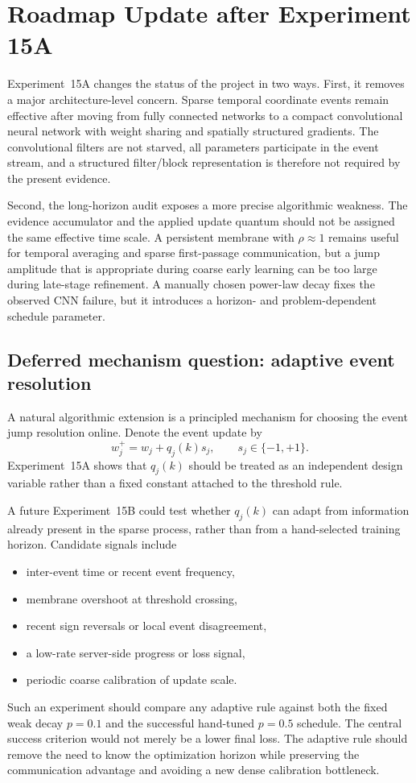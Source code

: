 \section{Roadmap Update after Experiment 15A}
\label{sec:roadmap-post-15a}

Experiment~15A changes the status of the project in two ways. First, it removes a major architecture-level concern. Sparse temporal coordinate events remain effective after moving from fully connected networks to a compact convolutional neural network with weight sharing and spatially structured gradients. The convolutional filters are not starved, all parameters participate in the event stream, and a structured filter/block representation is therefore not required by the present evidence.

Second, the long-horizon audit exposes a more precise algorithmic weakness. The evidence accumulator and the applied update quantum should not be assigned the same effective time scale. A persistent membrane with $\rho\approx1$ remains useful for temporal averaging and sparse first-passage communication, but a jump amplitude that is appropriate during coarse early learning can be too large during late-stage refinement. A manually chosen power-law decay fixes the observed CNN failure, but it introduces a horizon- and problem-dependent schedule parameter.

\subsection{Deferred mechanism question: adaptive event resolution}

A natural algorithmic extension is a principled mechanism for choosing the event jump resolution online. Denote the event update by
\begin{equation}
w_j^+=w_j+q_j(k)s_j,
\qquad s_j\in\{-1,+1\}.
\end{equation}
Experiment~15A shows that $q_j(k)$ should be treated as an independent design variable rather than a fixed constant attached to the threshold rule.

A future Experiment~15B could test whether $q_j(k)$ can adapt from information already present in the sparse process, rather than from a hand-selected training horizon. Candidate signals include
\begin{itemize}
    \item inter-event time or recent event frequency,
    \item membrane overshoot at threshold crossing,
    \item recent sign reversals or local event disagreement,
    \item a low-rate server-side progress or loss signal,
    \item periodic coarse calibration of update scale.
\end{itemize}
Such an experiment should compare any adaptive rule against both the fixed weak decay $p=0.1$ and the successful hand-tuned $p=0.5$ schedule. The central success criterion would not merely be a lower final loss. The adaptive rule should remove the need to know the optimization horizon while preserving the communication advantage and avoiding a new dense calibration bottleneck.

